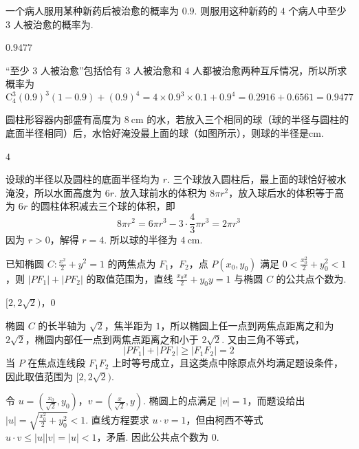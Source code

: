 \begin{problem}
一个病人服用某种新药后被治愈的概率为 \(0.9\). 则服用这种新药的 \(4\) 个病人中至少 \(3\) 人被治愈的概率为\fillinblank{}.
\end{problem}

\begin{answer}
\(0.9477\)
\end{answer}

\begin{solution}
“至少 \(3\) 人被治愈”包括恰有 \(3\) 人被治愈和 \(4\) 人都被治愈两种互斥情况，所以所求概率为
\[
\mathrm C_{4}^{3}(0.9)^3(1-0.9)+(0.9)^4
=4\times0.9^3\times0.1+0.9^4
=0.2916+0.6561
=0.9477
\]
\end{solution}

\begin{problem}
圆柱形容器内部盛有高度为 \(8\mathrm{~cm}\) 的水，若放入三个相同的球（球的半径与圆柱的底面半径相同）后，水恰好淹没最上面的球（如图所示），则球的半径是\fillinblank{}\(\mathrm{cm}\).
\end{problem}

\begin{answer}
\(4\)
\end{answer}

\begin{solution}
设球的半径以及圆柱的底面半径均为 \(r\). 三个球放入圆柱后，最上面的球恰好被水淹没，所以水面高度为 \(6r\). 放入球前水的体积为 \(8\pi r^2\)，放入球后水的体积等于高为 \(6r\) 的圆柱体积减去三个球的体积，即
\[
8\pi r^2=6\pi r^3-3\cdot\frac{4}{3}\pi r^3=2\pi r^3
\]
因为 \(r>0\)，解得 \(r=4\). 所以球的半径为 \(4\mathrm{~cm}\).
\end{solution}

\begin{problem}
已知椭圆 \(C: \frac{x^2}{2} + y^2 = 1\) 的两焦点为 \(F_1\)，\(F_2\)，点 \(P(x_0, y_0)\) 满足 \(0 < \frac{x_0^2}{2} + y_0^2 < 1\)，则 \(|PF_1| + |PF_2|\) 的取值范围为\fillinblank{}，直线 \(\frac{x_0 x}{2} + y_0 y = 1\) 与椭圆 \(C\) 的公共点个数为\fillinblank{}.
\end{problem}

\begin{answer}
\([2,2\sqrt{2})\)，\(0\)
\end{answer}

\begin{solution}
椭圆 \(C\) 的长半轴为 \(\sqrt{2}\)，焦半距为 \(1\)，所以椭圆上任一点到两焦点距离之和为 \(2\sqrt{2}\)，椭圆内部任一点到两焦点距离之和小于 \(2\sqrt{2}\). 又由三角不等式，
\[
|PF_1|+|PF_2|\geqslant|F_1F_2|=2
\]
当 \(P\) 在焦点连线段 \(F_1F_2\) 上时等号成立，且这类点中除原点外均满足题设条件，因此取值范围为 \([2,2\sqrt{2})\).

令 \(u=\left(\frac{x_0}{\sqrt{2}},y_0\right)\)，\(v=\left(\frac{x}{\sqrt{2}},y\right)\). 椭圆上的点满足 \(|v|=1\)，而题设给出 \(|u|=\sqrt{\frac{x_0^2}{2}+y_0^2}<1\). 直线方程要求 \(u\cdot v=1\)，但由柯西不等式 \(u\cdot v\leqslant|u||v|=|u|<1\)，矛盾. 因此公共点个数为 \(0\).
\end{solution}

